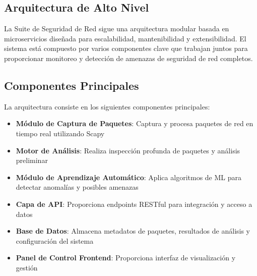 \subsection{Arquitectura de Alto Nivel}
La Suite de Seguridad de Red sigue una arquitectura modular basada en microservicios diseñada para escalabilidad, mantenibilidad y extensibilidad. El sistema está compuesto por varios componentes clave que trabajan juntos para proporcionar monitoreo y detección de amenazas de seguridad de red completos.


\subsection{Componentes Principales}
La arquitectura consiste en los siguientes componentes principales:

\begin{itemize}
    \item \textbf{Módulo de Captura de Paquetes}: Captura y procesa paquetes de red en tiempo real utilizando Scapy
    \item \textbf{Motor de Análisis}: Realiza inspección profunda de paquetes y análisis preliminar
    \item \textbf{Módulo de Aprendizaje Automático}: Aplica algoritmos de ML para detectar anomalías y posibles amenazas
    \item \textbf{Capa de API}: Proporciona endpoints RESTful para integración y acceso a datos
    \item \textbf{Base de Datos}: Almacena metadatos de paquetes, resultados de análisis y configuración del sistema
    \item \textbf{Panel de Control Frontend}: Proporciona interfaz de visualización y gestión
\end{itemize}

